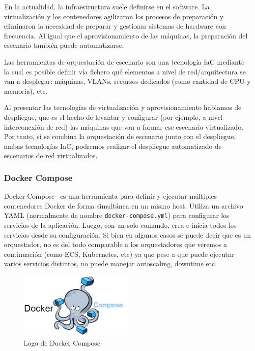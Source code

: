 	En la actualidad, la infraestructura suele definirse en el software. La virtualización y los contenedores agilizaron los procesos de preparación y eliminaron la necesidad de preparar y gestionar sistemas de hardware con frecuencia. Al igual que el aprovisionamiento de las máquinas, la preparación del escenario también puede automatizarse.

	Las herramientas de orquestación de escenario son una tecnología IaC mediante la cual es posible definir vía fichero qué elementos a nivel de red/arquitectura se van a desplegar: máquinas, VLANs, recursos dedicados (como cantidad de CPU y memoria), etc. 

	Al presentar las tecnologías de virtualización y aprovisionamiento hablamos de despliegue, que es el hecho de levantar y configurar (por ejemplo, a nivel interconexión de red) las máquinas que van a formar ese escenario virtualizado. Por tanto, si se combina la orquestación de escenario junto con el despliegue, ambas tecnologías IaC, podremos realizar el despliegue automatizado de escenarios de red virtualizados.

\subsubsection{Docker Compose}
	Docker Compose~\cite{orq2} es una herramienta para definir y ejecutar múltiples contenedores Docker de forma simultánea en un mismo host. Utiliza un archivo YAML (normalmente de nombre \texttt{docker-compose.yml}) para configurar los servicios de la aplicación. Luego, con un solo comando, crea e inicia todos los servicios desde su configuración. Si bien en algunos casos se puede decir que es un orquestador, no es del todo comparable a los orquestadores que veremos a continuación (como ECS, Kubernetes, etc) ya que pese a que puede ejecutar varios servicios distintos, no puede manejar autoscaling, downtime etc.

	\begin{figure}[h]
	\centering
	\includegraphics[width=0.5\textwidth]{../imgs/EdA/compose.png}
	\caption{Logo de Docker Compose}
	\label{fig:compose}
	\end{figure}

